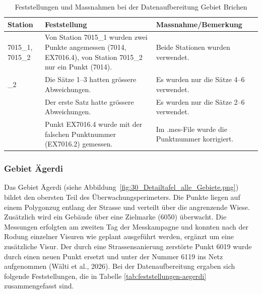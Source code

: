\begin{table}[H]
    \centering
    \begin{tabularx}{\textwidth}{p{2.2cm} X X}
        \toprule
        Station & Feststellung & Massnahme/Bemerkung \\
        \midrule
        7015\_1, 7015\_2 & Von Station 7015\_1 wurden zwei Punkte
        angemessen (7014, EX7016.4), von Station 7015\_2 nur ein Punkt
        (7014). & Beide Stationen wurden verwendet. \\
        \addlinespace
        7016\_2 & Die Sätze 1--3 hatten grössere Abweichungen.
        & Es wurden nur die Sätze 4--6 verwendet. \\
        \addlinespace
        7119 & Der erste Satz hatte grössere Abweichungen. &
        Es wurden nur die Sätze 2--6 verwendet. \\
        \addlinespace
        7023 & Punkt EX7016.4 wurde mit der falschen Punktnummer
        (EX7016.2) gemessen. & Im .mes-File wurde die Punktnummer
        korrigiert. \\
        \bottomrule
    \end{tabularx}
    \caption{Feststellungen und Massnahmen bei der Datenaufbereitung
    Gebiet Brichen}
    \label{tab:feststellungen-brichen}
\end{table}

\subsubsection{Gebiet Ägerdi}
\label{sec:gebiet-aegerdi}
Das Gebiet Ägerdi (siehe Abbildung~\ref{fig:30_Detailtafel_alle_Gebiete.png}) bildet den obersten Teil des Überwachungsperimeters.
Die Punkte liegen auf einem Polygonzug entlang der Strasse und verteilt
über die angrenzende Wiese. Zusätzlich wird ein Gebäude über eine
Zielmarke (6050) überwacht. Die Messungen erfolgten am zweiten Tag der
Messkampagne und konnten nach der Rodung einzelner Visuren wie geplant
ausgeführt werden, ergänzt um eine zusätzliche Visur. Der durch eine
Strassensanierung zerstörte Punkt 6019 wurde durch einen neuen Punkt
ersetzt und unter der Nummer 6119 ins Netz aufgenommen (Wälti et al., 2026). Bei der Datenaufbereitung
ergaben sich folgende Feststellungen, die in Tabelle \ref{tab:feststellungen-aegerdi} zusammengefasst sind.

